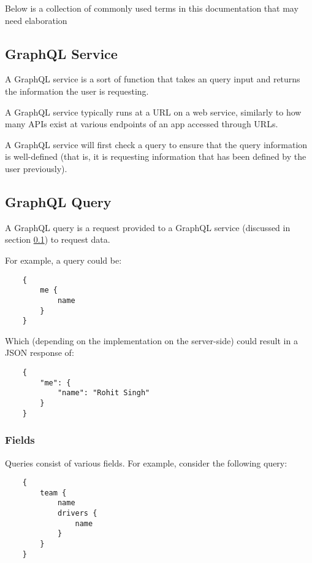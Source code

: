 \documentclass{article}
\begin{document}
Below is a collection of commonly used terms in this documentation that may need elaboration

\subsection{GraphQL Service}\label{glossary:service}

A GraphQL service is a sort of function that takes an query input and returns the information the user is requesting.

A GraphQL service typically runs at a URL on a web service, similarly to how many APIs exist at various endpoints of an app accessed through URLs.

A GraphQL service will first check a query to ensure that the query information is well-defined (that is, it is requesting information that has been defined by the user previously). 

\subsection{GraphQL Query}\label{glossary:query}

A GraphQL query is a request provided to a GraphQL service (discussed in section \ref{glossary:service}) to request data.

For example, a query could be:

\begin{verbatim}
    {
        me {
            name
        }
    }
\end{verbatim}

Which (depending on the implementation on the server-side) could result in a JSON response of:

\begin{verbatim}
    {
        "me": {
            "name": "Rohit Singh"
        }
    }
\end{verbatim}

\subsubsection{Fields}

Queries consist of various fields. For example, consider the following query:

\begin{verbatim}
    {
        team {
            name
            drivers {
                name
            }
        }
    }
\end{verbatim}
\end{document}
